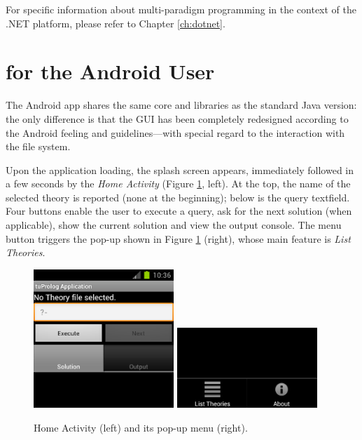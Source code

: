For specific information about multi-paradigm programming in the context of the .NET platform, please refer to Chapter \ref{ch:dotnet}.


\section{\tuprolog{} for the Android User}
\label{sec:android-user-perspective}

The \tuprolog{} Android app shares the same core and libraries as the standard Java version: the only difference is that the GUI has been completely redesigned according to the Android feeling and guidelines---with special regard to the interaction with the file system.

Upon the application loading, the splash screen appears, immediately followed in a few seconds by the \textit{Home Activity} (Figure \ref{fig:android12}, left).
%
At the top, the name of the selected theory is reported (none at the beginning); below is the query textfield.
%
Four buttons enable the user to execute a query, ask for the next solution (when applicable), show the current solution and view the output console.
%
The menu button triggers the pop-up shown in Figure \ref{fig:android12} (right), whose main feature is \textit{List Theories}.

\begin{figure}
  \includegraphics[width=200px]{images/android1.png}
  \includegraphics[width=200px]{images/android2.png}
  \caption{Home Activity (left) and its pop-up menu (right).}\label{fig:android12}
\end{figure}

